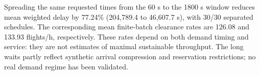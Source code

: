 Spreading the same requested times from the 60 s to the 1800 s window reduces mean weighted delay by 77.24\% (204,789.4 to 46,607.7 s), with 30/30 separated schedules. The corresponding mean finite-batch clearance rates are 126.08 and 133.93 flights/h, respectively. These rates depend on both demand timing and service: they are not estimates of maximal sustainable throughput. The long waits partly reflect synthetic arrival compression and reservation restrictions; no real demand regime has been validated.
